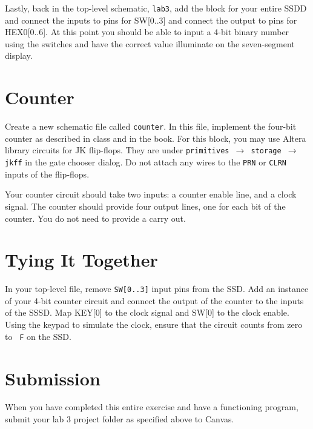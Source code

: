 \documentclass[10pt]{article}
\begin{document}
Lastly, back in the top-level schematic, {\tt lab3}, add the block for
your entire SSDD and connect the inputs to pins for SW[0..3] and
connect the output to pins for HEX0[0..6]. At this point you should
be able to input a 4-bit binary number using the switches and have the
correct value illuminate on the seven-segment display.

\section{Counter}

Create a new schematic file called {\tt counter}. In this file,
implement the four-bit counter as described in class and in the
book. For this block, you may use Altera library circuits for JK
flip-flops. They are under {\tt primitives $\rightarrow$ storage
  $\rightarrow$ jkff} in the gate chooser dialog. Do not attach any
wires to the {\tt PRN} or {\tt CLRN} inputs of the flip-flops.

Your counter circuit should take two inputs: a counter enable line,
and a clock signal. The counter should provide four output lines, one
for each bit of the counter. You do not need to provide a carry out.

\section{Tying It Together}

In your top-level file, remove {\tt SW[0..3]} input pins from the
SSD. Add an instance of your 4-bit counter circuit and connect the
output of the counter to the inputs of the SSSD. Map KEY[0] to the
clock signal and SW[0] to the clock enable. Using the keypad to
simulate the clock, ensure that the circuit counts from zero to {\tt
  F} on the SSD.

\section*{Submission}

When you have completed this entire exercise and have a functioning
program, submit your lab 3 project folder as specified above to Canvas.
\end{document}
